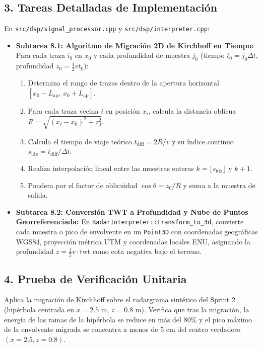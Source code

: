 \documentclass[11pt,a4paper]{article}
\begin{document}
\subsection{3. Tareas Detalladas de Implementación}
En \texttt{src/dsp/signal\_processor.cpp} y \texttt{src/dsp/interpreter.cpp}:
\begin{itemize}
    \item \textbf{Subtarea 8.1: Algoritmo de Migración 2D de Kirchhoff en Tiempo:}
    Para cada traza $i_0$ en $x_0$ y cada profundidad de muestra $j_0$ (tiempo $t_0 = j_0 \Delta t$, profundidad $z_0 = \frac{1}{2} v t_0$):
    \begin{enumerate}
        \item Determina el rango de trazas dentro de la apertura horizontal $[x_0 - L_{\text{ap}}, \, x_0 + L_{\text{ap}}]$.
        \item Para cada traza vecina $i$ en posición $x_i$, calcula la distancia oblicua $R = \sqrt{(x_i - x_0)^2 + z_0^2}$.
        \item Calcula el tiempo de viaje teórico $t_{\text{diff}} = 2R / v$ y su índice continuo $s_{\text{idx}} = t_{\text{diff}} / \Delta t$.
        \item Realiza interpolación lineal entre las muestras enteras $k = \lfloor s_{\text{idx}} \rfloor$ y $k+1$.
        \item Pondera por el factor de oblicuidad $\cos\theta = z_0 / R$ y suma a la muestra de salida.
    \end{enumerate}

    \item \textbf{Subtarea 8.2: Conversión TWT a Profundidad y Nube de Puntos Georreferenciada:}
    En \texttt{RadarInterpreter::transform\_to\_3d}, convierte cada muestra o pico de envolvente en un \texttt{Point3D} con coordenadas geográficas WGS84, proyección métrica UTM y coordenadas locales ENU, asignando la profundidad $z = \frac{1}{2} v \cdot \text{twt}$ como cota negativa bajo el terreno.
\end{itemize}

\subsection{4. Prueba de Verificación Unitaria}
Aplica la migración de Kirchhoff sobre el radargrama sintético del Sprint 2 (hipérbola centrada en $x = 2.5\text{ m}$, $z = 0.8\text{ m}$).
Verifica que tras la migración, la energía de las ramas de la hipérbola se reduce en más del $80\%$ y el pico máximo de la envolvente migrada se concentra a menos de $5\text{ cm}$ del centro verdadero $(x = 2.5, z = 0.8)$.
\end{document}
